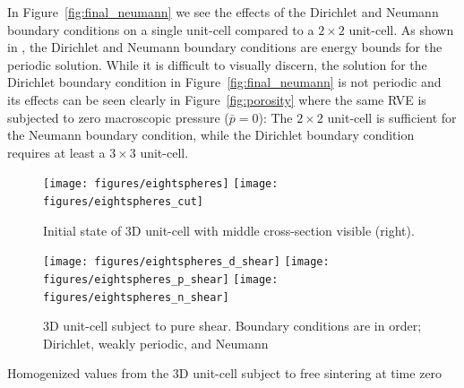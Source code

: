 \documentclass[12pt,a4paper]{article}
\newcommand{\figref}[1]{Figure~\ref{#1}}
\begin{document}
In \figref{fig:final_neumann} we see the effects of the Dirichlet and Neumann boundary conditions on a single unit-cell compared to a $2\times 2$ unit-cell.
As shown in \cite{ohman_variationally_2014}, the Dirichlet and Neumann boundary conditions are energy bounds for the periodic solution.
While it is difficult to visually discern, the solution for the Dirichlet boundary condition in \figref{fig:final_neumann} is not periodic and its effects can be seen clearly in \figref{fig:porosity} where the same RVE is subjected to zero macroscopic pressure ($\bar{p}=0$): The $2\times2$ unit-cell is sufficient for the Neumann boundary condition, while the Dirichlet boundary condition requires at least a $3\times 3$ unit-cell.




\begin{figure}[hbp!]
 \centering
 \texttt{[image: figures/eightspheres]}
 \texttt{[image: figures/eightspheres\_cut]}
 \caption{Initial state of 3D unit-cell with middle cross-section visible (right).}
 \label{fig:rve_3d}
\end{figure}


\begin{figure}[htbp!]
 \centering
 \texttt{[image: figures/eightspheres\_d\_shear]}
 \texttt{[image: figures/eightspheres\_p\_shear]}
 \texttt{[image: figures/eightspheres\_n\_shear]}
 \caption{3D unit-cell subject to pure shear. Boundary conditions are in order; Dirichlet, weakly periodic, and Neumann}
 \label{fig:rve_3d_deformed}
\end{figure}

\begin{table}[htbp!]
 \centering



 \caption{Homogenized values from the 3D unit-cell subject to free sintering at time zero}
 \label{tab:rve_3d_homog}
\end{table}
\end{document}
